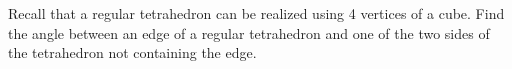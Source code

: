 Recall that a regular tetrahedron can be realized using 4 vertices of a cube. Find the angle between an edge of a regular tetrahedron and one of the two sides of the tetrahedron not containing the edge.